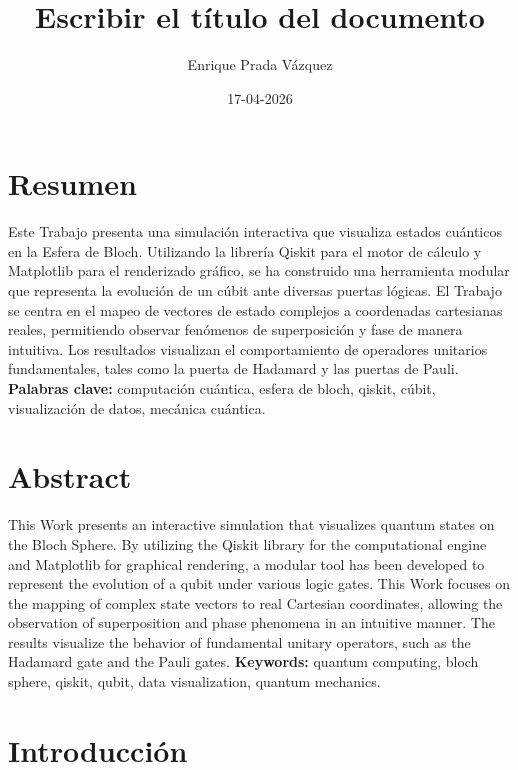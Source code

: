 \documentclass[11pt,a4paper,spanish]{book}
\title{Escribir el título del documento}
\author{Enrique Prada Vázquez}
\date{17-04-2026}
\begin{document}
\renewcommand{\listfigurename}{Índice de figuras}
\renewcommand{\listtablename}{Índice de tablas}
\renewcommand{\contentsname}{Índice de contenidos}
\renewcommand{\figurename}{Figura}
\renewcommand{\tablename}{Tabla} 

\maketitle
\frontmatter
\tableofcontents
\listoffigures

\chapter{Resumen}
Este Trabajo presenta una simulación interactiva que visualiza estados cuánticos en la Esfera de Bloch. Utilizando la librería Qiskit para el motor de cálculo y Matplotlib para el renderizado gráfico, se ha construido una herramienta modular que representa la evolución de un cúbit ante diversas puertas lógicas. El Trabajo se centra en el mapeo de vectores de estado complejos a coordenadas cartesianas reales, permitiendo observar fenómenos de superposición y fase de manera intuitiva. Los resultados visualizan el comportamiento de operadores unitarios fundamentales, tales como la puerta de Hadamard y las puertas de Pauli.
\vspace{0.5cm}
{\bf Palabras clave:} computación cuántica, esfera de bloch, qiskit, cúbit, visualización de datos, mecánica cuántica.

\chapter{Abstract}
This Work presents an interactive simulation that visualizes quantum states on the Bloch Sphere. By utilizing the Qiskit library for the computational engine and Matplotlib for graphical rendering, a modular tool has been developed to represent the evolution of a qubit under various logic gates. This Work focuses on the mapping of complex state vectors to real Cartesian coordinates, allowing the observation of superposition and phase phenomena in an intuitive manner. The results visualize the behavior of fundamental unitary operators, such as the Hadamard gate and the Pauli gates.
\vspace{0.5cm}
{\bf Keywords:} quantum computing, bloch sphere, qiskit, qubit, data visualization, quantum mechanics.

\mainmatter

\chapter{Introducción}
\end{document}
